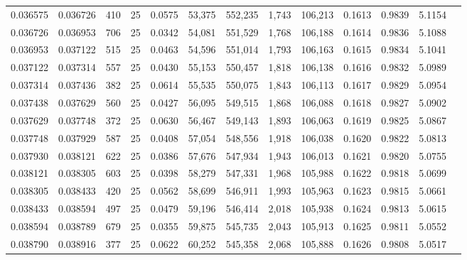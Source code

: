 \begin{tabular}{rrrrrrrrrrrrr}
0.036575 & 0.036726 &   410 &  25 &                                     0.0575 &  53,375 & 552,235 &   1,743 & 106,213 & 0.1613 & 0.9839 & 5.1154 \\
0.036726 & 0.036953 &   706 &  25 &                                     0.0342 &  54,081 & 551,529 &   1,768 & 106,188 & 0.1614 & 0.9836 & 5.1088 \\
0.036953 & 0.037122 &   515 &  25 &                                     0.0463 &  54,596 & 551,014 &   1,793 & 106,163 & 0.1615 & 0.9834 & 5.1041 \\
0.037122 & 0.037314 &   557 &  25 &                                     0.0430 &  55,153 & 550,457 &   1,818 & 106,138 & 0.1616 & 0.9832 & 5.0989 \\
0.037314 & 0.037436 &   382 &  25 &                                     0.0614 &  55,535 & 550,075 &   1,843 & 106,113 & 0.1617 & 0.9829 & 5.0954 \\
0.037438 & 0.037629 &   560 &  25 &                                     0.0427 &  56,095 & 549,515 &   1,868 & 106,088 & 0.1618 & 0.9827 & 5.0902 \\
0.037629 & 0.037748 &   372 &  25 &                                     0.0630 &  56,467 & 549,143 &   1,893 & 106,063 & 0.1619 & 0.9825 & 5.0867 \\
0.037748 & 0.037929 &   587 &  25 &                                     0.0408 &  57,054 & 548,556 &   1,918 & 106,038 & 0.1620 & 0.9822 & 5.0813 \\
0.037930 & 0.038121 &   622 &  25 &                                     0.0386 &  57,676 & 547,934 &   1,943 & 106,013 & 0.1621 & 0.9820 & 5.0755 \\
0.038121 & 0.038305 &   603 &  25 &                                     0.0398 &  58,279 & 547,331 &   1,968 & 105,988 & 0.1622 & 0.9818 & 5.0699 \\
0.038305 & 0.038433 &   420 &  25 &                                     0.0562 &  58,699 & 546,911 &   1,993 & 105,963 & 0.1623 & 0.9815 & 5.0661 \\
0.038433 & 0.038594 &   497 &  25 &                                     0.0479 &  59,196 & 546,414 &   2,018 & 105,938 & 0.1624 & 0.9813 & 5.0615 \\
0.038594 & 0.038789 &   679 &  25 &                                     0.0355 &  59,875 & 545,735 &   2,043 & 105,913 & 0.1625 & 0.9811 & 5.0552 \\
0.038790 & 0.038916 &   377 &  25 &                                     0.0622 &  60,252 & 545,358 &   2,068 & 105,888 & 0.1626 & 0.9808 & 5.0517 \\

\end{tabular}
